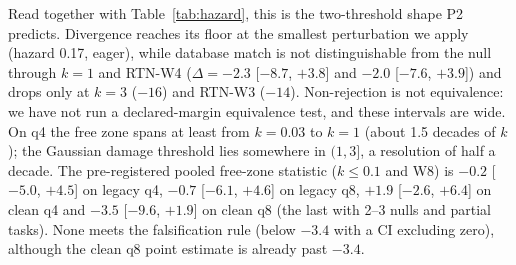 \begin{table}[t]
\centering
\footnotesize
\setlength{\tabcolsep}{4pt}
\caption{q4, $\Delta$ database match against the pooled 10-draw null (pp; legacy and clean draws pooled). Wins / losses: episodes that pass a task the null majority fails / fail a task it passes (definition in Appendix~\ref{app:stats}). Live snapshot 2026-09-29T02:36Z.}
\label{tab:delta}
\end{table}

Read together with Table~\ref{tab:hazard}, this is the two-threshold shape P2 predicts. Divergence reaches its floor at the smallest perturbation we apply (hazard 0.17, eager), while database match is not distinguishable from the null through $k{=}1$ and RTN-W4 ($\Delta = -2.3$ [$-8.7$, $+3.8$] and $-2.0$ [$-7.6$, $+3.9$]) and drops only at $k{=}3$ ($-16$\pp{}) and RTN-W3 ($-14$\pp{}). Non-rejection is not equivalence: we have not run a declared-margin equivalence test, and these intervals are wide. On q4 the free zone spans at least from $k{=}0.03$ to $k{=}1$ (about 1.5 decades of $k$); the Gaussian damage threshold lies somewhere in $(1, 3]$, a resolution of half a decade. The pre-registered pooled free-zone statistic ($k \le 0.1$ and W8) is $-0.2$\pp{} [$-5.0$, $+4.5$] on legacy q4, $-0.7$\pp{} [$-6.1$, $+4.6$] on legacy q8, $+1.9$\pp{} [$-2.6$, $+6.4$] on clean q4 and $-3.5$\pp{} [$-9.6$, $+1.9$] on clean q8 (the last with 2--3 nulls and partial tasks). None meets the falsification rule (below $-3.4$\pp{} with a CI excluding zero), although the clean q8 point estimate is already past $-3.4$.

